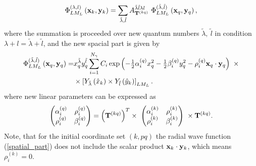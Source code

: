 \documentclass[
12pt, %
oneside, %
english, %
onehalfspacing, %
onehalfspacing, %
headsepline, %
]{MastersDoctoralThesis} %
\begin{document}
  \begin{equation}
 \label{transform_spatial_part}
 \Phi^{(\lambda,l)}_{LM_L}\left( {\bf x}_k, {\bf y}_k \right) = \sum_{\tilde{\lambda}, \tilde{l}} A^{\tilde{\lambda} \tilde{l} \lambda l}_{{\bf T}^{(kq)} }~
  \Phi_{LM_L}^{(\tilde{\lambda},\tilde{l}) } \left(  {\bf x}_q, {\bf y}_q \right) ,
 \end{equation}
where the summation is proceeded over new quantum numbers $\tilde{\lambda},~\tilde{l}$ in condition $\lambda+l=\tilde{\lambda}+\tilde{l}$, and the new spacial part is given by
\begin{align}
 \Phi_{LM_L}^{(\tilde{\lambda},\tilde{l}) } \left(  {\bf x}_q, {\bf y}_q \right)  =  &
x^{\tilde{\lambda}}_q y^{\tilde{l}}_q 
\sum_{i=1}^{N_\gamma} C_i 
\exp\left( - \tfrac{1}{2} \alpha_i^{(q)} x^2_q -\tfrac{1}{2}  \beta_i^{(q)} y^2_q 
- \rho_i^{(q)}   {\bf x}_q \cdot {\bf y}_q 
   \right)~
\times \nonumber \\
& \times \left[ 
Y_{\tilde{\lambda}} \left(\hat{x}_k \right) \times Y_{\tilde{l}} \left(\hat{y}_k \right)
\right]_{LM_L}.
\label{new_spacial_part}
\end{align}
where new linear parameters can be expressed as
\begin{align}
\begin{pmatrix}
\alpha_i^{(q)} & \rho_i^{(q)} \\ 
\rho_i^{(q)} & \beta_i^{(q)}
\end{pmatrix}  = \left( {\bf T}^{(kq)} \right)^{T} \times  ~
\begin{pmatrix}
\alpha_i^{(k)} & \rho_i^{(k)} \\ 
\rho_i^{(k)} & \beta_i^{(k)}
\end{pmatrix} ~ \times
  {\bf T}^{(kq)}.
\end{align}
Note, that for the initial  coordinate set $(k,pq)$ the radial wave function (\ref{spatial_part}) does not include the scalar product ${\bf x}_k \cdot {\bf y}_k$, which means $\rho_i^{(k)}=0$.  
\end{document}
